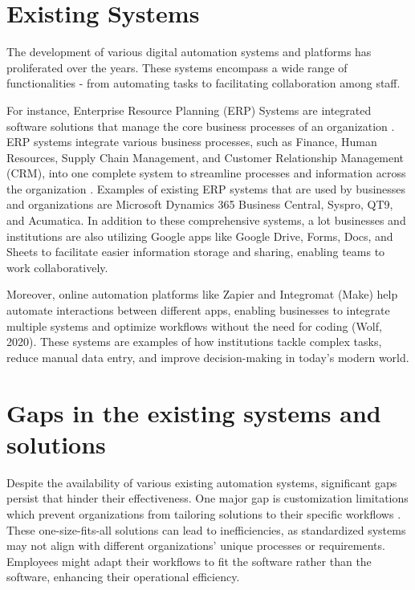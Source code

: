 \section{Existing Systems}

The development of various digital automation systems and platforms has proliferated over the years. These systems encompass a wide range of functionalities - from automating tasks to facilitating collaboration among staff.

For instance, Enterprise Resource Planning (ERP) Systems are integrated software solutions that manage the core business processes of an organization \cite{blahusiakova2023}. ERP systems integrate various business processes, such as Finance, Human Resources, Supply Chain Management, and Customer Relationship Management (CRM), into one complete system to streamline processes and information across the organization \cite{kimberling2024}. Examples of existing ERP systems that are used by businesses and organizations are Microsoft Dynamics 365 Business Central, Syspro, QT9, and Acumatica. In addition to these comprehensive systems, a lot businesses and institutions are also utilizing Google apps like Google Drive, Forms, Docs, and Sheets to facilitate easier information storage and sharing, enabling teams to work collaboratively. 

Moreover, online automation platforms like Zapier and Integromat (Make) help automate interactions between different apps, enabling businesses to integrate multiple systems and optimize workflows without the need for coding (Wolf, 2020). These systems are examples of how institutions tackle complex tasks, reduce manual data entry, and improve decision-making in today's modern world.

\section{Gaps in the  existing systems and solutions}

Despite the availability of various existing automation systems, significant gaps persist that hinder their effectiveness. One major gap is customization limitations which prevent organizations from tailoring solutions to their specific workflows \cite{aleixo2010}. These one-size-fits-all solutions can lead to inefficiencies, as standardized systems may not align with different organizations' unique processes or requirements. Employees might adapt their workflows to fit the software rather than the software, enhancing their operational efficiency. 


